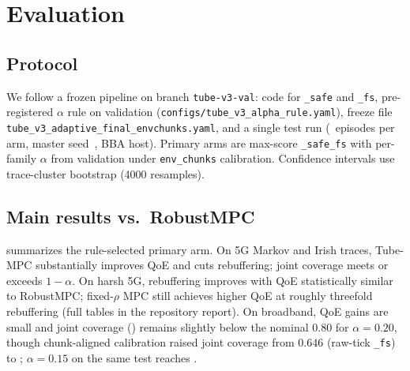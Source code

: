 \section{Evaluation}
\label{sec:eval}

\subsection{Protocol}
\label{sec:eval:protocol}

We follow a frozen pipeline on branch \texttt{tube-v3-val}: code for \texttt{\_safe} and \texttt{\_fs}, pre-registered \(\alpha\) rule on validation (\texttt{configs/tube\_v3\_alpha\_rule.yaml}), freeze file \texttt{tube\_v3\_adaptive\_final\_envchunks.yaml}, and a single test run (\TubeEpisodes\ episodes per arm, master seed~\TubeMasterSeed, BBA host).
Primary arms are max-score \texttt{\_safe\_fs} with per-family \(\alpha\) from validation under \texttt{env\_chunks} calibration.
Confidence intervals use trace-cluster bootstrap (4000 resamples).

\subsection{Main results vs.\ RobustMPC}
\label{sec:eval:main}

 summarizes the rule-selected primary arm.
On \mbox{5G} Markov and Irish traces, Tube-MPC substantially improves QoE and cuts rebuffering; joint coverage meets or exceeds \(1-\alpha\).
On harsh \mbox{5G}, rebuffering improves with QoE statistically similar to RobustMPC; fixed-\(\rho\) MPC still achieves higher QoE at roughly threefold rebuffering (full tables in the repository report).
On broadband, QoE gains are small and joint coverage (\TubeBBJoint) remains slightly below the nominal \(0.80\) for \(\alpha{=}0.20\), though chunk-aligned calibration raised joint coverage from \(0.646\) (raw-tick \texttt{\_fs}) to \TubeBBJoint; \(\alpha{=}0.15\) on the same test reaches .

